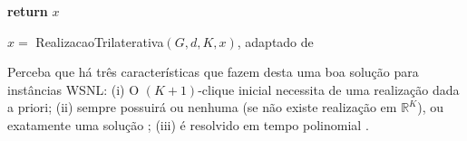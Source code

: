 \begin{algorithm}[H]
	\label{alg:realizacaoTrilateration}
	\textbf{return} $x$\;
	\caption{$x =$ RealizacaoTrilaterativa$(G,d, K, x)$, adaptado de \cite{libertiEDG}}
\end{algorithm}
\vspace{0.4cm}

Perceba que há três características que fazem desta uma boa solução para instâncias WSNL: (i) O $(K+1)$-clique inicial necessita de uma realização dada a priori; (ii) sempre possuirá ou nenhuma (se não existe realização em $\mathbb{R}^K$), ou exatamente uma solução \cite{carlileGDandAplications}; (iii) é resolvido em tempo polinomial \cite{libertiEDG}.





